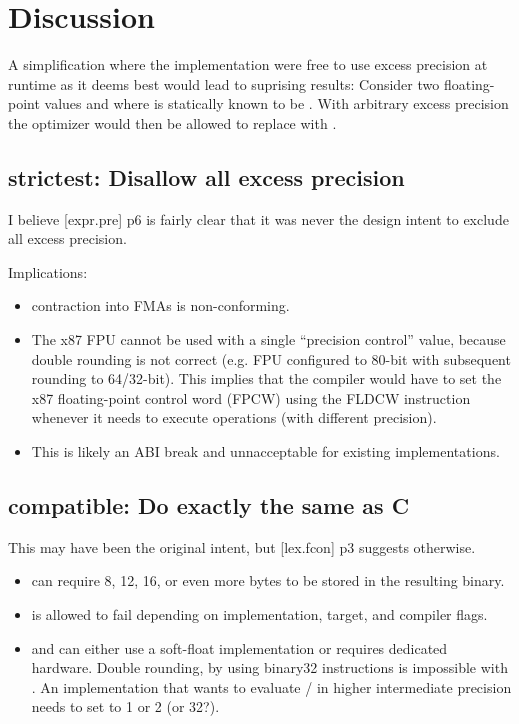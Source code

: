 \section{Discussion}

A simplification where the implementation were free to use excess precision at
runtime as it deems best would lead to suprising results:
Consider two floating-point values  and  where
 is statically known to be .
With arbitrary excess precision the optimizer would then be allowed to replace
 with .

\subsection{strictest: Disallow all excess precision}\label{d:1}

I believe [expr.pre] p6 is fairly clear that it was never the design intent to
exclude all excess precision.

Implications:
\begin{itemize}
  \item \Fp contraction into FMAs is non-conforming.

  \item The x87 FPU cannot be used with a single “precision control” value,
    because double rounding is not correct (e.g. FPU configured to 80-bit with
    subsequent rounding to 64/32-bit).
    This implies that the compiler would have to set the x87 floating-point
    control word (FPCW) using the FLDCW instruction whenever it needs to
    execute \fp operations (with different precision).

  \item This is likely an ABI break and unnacceptable for existing
    implementations.
\end{itemize}

\subsection{compatible: Do exactly the same as C}\label{d:2}

This may have been the original intent, but [lex.fcon] p3 suggests otherwise.

\begin{itemize}
  \item {} can require 8, 12, 16, or even more bytes to be
    stored in the resulting binary.

  \item {} is allowed to fail
    depending on implementation, target, and compiler flags.

  \item {} and  can either use a
    soft-float implementation or requires dedicated hardware.
    Double rounding, by using binary32 instructions is impossible with
    .
    An implementation that wants to evaluate
    / in higher intermediate
    precision needs to set  to 1 or 2 (or 32?).
\end{itemize}

